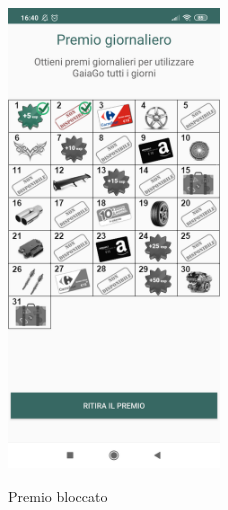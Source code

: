 \begin{itemize}
\begin{figure}[H]
	 	\includegraphics[width=0.5\textwidth]{res/images/daily1.png}\\
	 	\caption{Premio bloccato}
	 	\label{dailyb}
	 \end{figure}
	 \pagebreak
\end{itemize}




